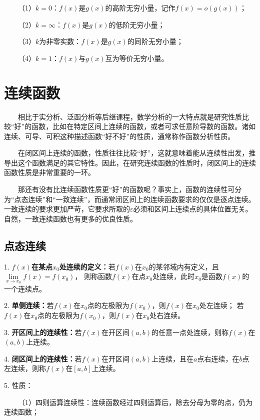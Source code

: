 ~~~~（1）$k=0$：$f(x)$是$g(x)$的高阶无穷小量，记作$f(x)=o\left(g(x)\right)$；

~~~~（2）$k=\infty$：$f(x)$是$g(x)$的低阶无穷小量；

~~~~（3）$k$为非零实数：$f(x)$是$g(x)$的同阶无穷小量；

~~~~（4）$k=1$：$f(x)$与$g(x)$互为等价无穷小量。

\section{连续函数}

\begin{tcolorbox}[colback=red!5,colframe=red!75!black]
    ~~~~相比于实分析、泛函分析等后继课程，数学分析的一大特点就是研究性质比较“好”的函数，比如在特定区间上连续的函数，或者可求任意阶导数的函数。诸如连续、可导、可积这种描述函数“好不好”的性质，通常称作函数分析性质。

    ~~~~在闭区间上连续的函数，性质往往比较“好”，这就意味着能从连续性出发，推导出这个函数满足的其它特性。因此，在研究连续函数的性质时，闭区间上的连续函数性质是非常重要的一环。

    ~~~~那还有没有比连续函数性质更“好”的函数呢？事实上，函数的连续性可分为“点态连续”和“一致连续”，而通常闭区间上的连续函数要求的仅仅是逐点连续。一致连续的要求更加严苛，它要求所取的$\varepsilon$必须和区间上连续点的具体位置无关。
    自然，一致连续函数也有更多的优良性质。

\end{tcolorbox}

\subsection{点态连续}

1. \textbf{$f(x)$在某点$x_0$处连续的定义：}若$f(x)$在$x_0$的某邻域内有定义，且$\lim\limits_{x\rightarrow x_0}f(x)=f(x_0)$，
则称函数$f(x)$在点$x_0$处连续，此时$x_0$是函数$f(x)$的一个连续点。

2. \textbf{单侧连续：}若$f(x)$在$x_0$点的左极限为$f(x_0)$，则$f(x)$在$x_0$处左连续；
若$f(x)$在$x_0$点的左极限为$f(x_0)$，则$f(x)$在$x_0$处右连续。

3. \textbf{开区间上的连续性：}若$f(x)$在开区间$(a,b)$的任意一点处连续，则称$f(x)$在$(a,b)$上连续。

4. \textbf{闭区间上的连续性：}若$f(x)$在开区间$(a,b)$上连续，且在$a$点右连续，在$b$点左连续，则称$f(x)$在$[a,b]$上连续。

5. 性质：

~~~~（1）四则运算连续性：连续函数经过四则运算后，除去分母为零的点，仍为连续函数；

